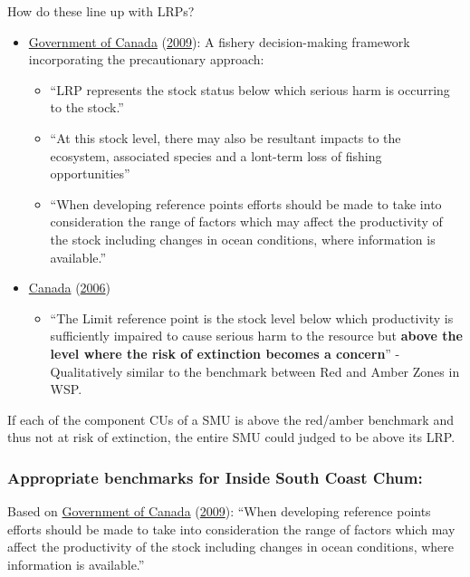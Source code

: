 \documentclass[11pt]{book}
\begin{document}
How do these line up with LRPs?
\begin{itemize}

\item
  \protect\hyperlink{ref-government_of_canada_fishery_2009}{Government of Canada} (\protect\hyperlink{ref-government_of_canada_fishery_2009}{2009}): A fishery decision-making framework incorporating the precautionary approach:
  \begin{itemize}

  \item
    ``LRP represents the stock status below which serious harm is occurring to the stock.''
  \item
    ``At this stock level, there may also be resultant impacts to the ecosystem, associated species and a lont-term loss of fishing opportunities''
  \item
    ``When developing reference points efforts should be made to take into consideration the range of factors which may affect the productivity of the stock including changes in ocean conditions, where information is available.''
  \end{itemize}
\item
  \protect\hyperlink{ref-fisheries_and_oceans_canada_harvest_2006}{Canada} (\protect\hyperlink{ref-fisheries_and_oceans_canada_harvest_2006}{2006})
  \begin{itemize}

  \item
    ``The Limit reference point is the stock level below which productivity is sufficiently impaired to cause serious harm to the resource but \textbf{above the level where the risk of extinction becomes a concern}'' - Qualitatively similar to the benchmark between Red and Amber Zones in WSP.
  \end{itemize}
\end{itemize}
If each of the component CUs of a SMU is above the red/amber benchmark and thus not at risk of extinction, the entire SMU could judged to be above its LRP.

\hypertarget{appropriate-benchmarks-for-inside-south-coast-chum}{%
\subsubsection{Appropriate benchmarks for Inside South Coast Chum:}\label{appropriate-benchmarks-for-inside-south-coast-chum}}

Based on \protect\hyperlink{ref-government_of_canada_fishery_2009}{Government of Canada} (\protect\hyperlink{ref-government_of_canada_fishery_2009}{2009}): ``When developing reference points efforts should be made to take into consideration the range of factors which may affect the productivity of the stock including changes in ocean conditions, where information is available.''
\end{document}
